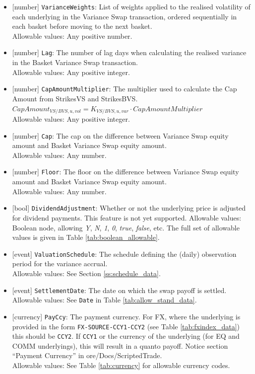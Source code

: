 \begin{itemize}
  \item{}[number] \lstinline!VarianceWeights!: List of weights applied to the realised volatility of each underlying in the Variance Swap transaction,
  ordered sequentially in each basket before moving to the next basket. \\
  Allowable values: Any positive number.
  \item{}[number] \lstinline!Lag!: The number of lag days when calculating the realised variance in the Basket Variance Swap transaction.\\
  Allowable values: Any positive integer.
  \item{}[number] \lstinline!CapAmountMultiplier!: The multiplier used to calculate the Cap Amount from StrikesVS and StrikesBVS.
  $CapAmount_{VS/BVS,u,vol} = K_{VS/BVS,u,var} \cdot CapAmountMultiplier$\\
  Allowable values: Any positive integer.
  \item{}[number] \lstinline!Cap!: The cap on the difference between Variance Swap equity amount and Basket Variance Swap equity amount. \\
  Allowable values: Any number.
  \item{}[number] \lstinline!Floor!: The floor on the difference between Variance Swap equity amount and Basket Variance Swap equity amount. \\
  Allowable values: Any number.
  \item{}[bool] \lstinline!DividendAdjustment!: Whether or not the underlying price is adjusted for dividend payments. This feature is
  not yet supported.
  Allowable values: Boolean node, allowing \emph{Y}, \emph{N}, \emph{1}, \emph{0}, \emph{true}, \emph{false}, etc.
  The full set of allowable values is given in Table \ref{tab:boolean_allowable}.
  \item{}[event] \lstinline!ValuationSchedule!: The schedule defining the (daily) observation period for the variance accrual. \\
  Allowable values: See Section \ref{ss:schedule_data}.
  \item{}[event] \lstinline!SettlementDate!: The date on which the swap payoff is settled. \\
  Allowable values: See \lstinline!Date! in Table \ref{tab:allow_stand_data}.
  \item{}[currency] \lstinline!PayCcy!: The payment currency. For FX, where the underlying is provided
      in the form \lstinline!FX-SOURCE-CCY1-CCY2! (see Table \ref{tab:fxindex_data}) this should
      be \lstinline!CCY2!. If \lstinline!CCY1! or the currency of the underlying (for EQ and
      COMM underlyings), this will result in a quanto payoff. Notice section ``Payment Currency'' in ore/Docs/ScriptedTrade. \\
        Allowable values: See Table \ref{tab:currency} for allowable currency codes.
\end{itemize}

